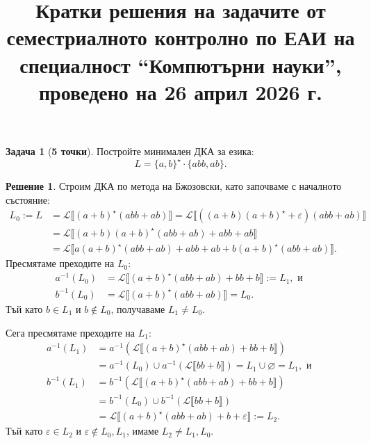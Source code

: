 \documentclass[12pt]{article}
\newcommand{\calL}{\mathcal{L}}
\newcommand{\db}[1]{\llbracket #1 \rrbracket}
\theoremstyle{definition}
\newtheorem{problem}{Задача}
\newtheorem*{solution}{Решение}
\begin{document}
\title{Кратки решения на задачите от семестриалното контролно по ЕАИ на специалност ``Компютърни науки'', проведено на 26 април 2026 г.}
\date{}

\maketitle

\begin{problem}[{\bf 5 точки}]
Постройте минимален ДКА за езика:
\[
  L = \{ a, b \}^\star \cdot \{ abb, ab \}.
\]
\end{problem}

\begin{solution}
Строим ДКА по метода на Бжозовски, като започваме с началното състояние:
\begin{align*}
  L_0 := L & = \calL \db{(a + b)^\star (abb + ab)} = \calL \db{((a + b)(a + b)^\star + \varepsilon) (abb + ab)} \\ 
           & = \calL \db{(a + b)(a + b)^\star (abb + ab) + abb + ab} \\
           & = \calL \db{a (a + b)^\star (abb + ab) + abb + ab + b (a + b)^\star (abb + ab)}.
\end{align*}
Пресмятаме преходите на $L_0$:
\begin{align*}
  a^{-1}(L_0) & = \calL \db{(a + b)^\star (abb + ab) + bb + b} := L_1, \text{ и } \\
  b^{-1}(L_0) & = \calL \db{(a + b)^\star (abb + ab)} = L_0.
\end{align*}
Тъй като $b \in L_1$ и $b \not\in L_0$, получаваме $L_1 \neq L_0$.

Сега пресмятаме преходите на $L_1$:
\begin{align*}
  a^{-1}(L_1) & = a^{-1}(\calL \db{(a + b)^\star (abb + ab) + bb + b}) \\ 
              & = a^{-1}(L_0) \cup a^{-1}(\calL \db{bb + b}) = L_1 \cup \varnothing = L_1, \text{ и } \\
  b^{-1}(L_1) & = b^{-1}(\calL \db{(a + b)^\star (abb + ab) + bb + b}) \\ 
              & = b^{-1}(L_0) \cup b^{-1}(\calL \db{bb + b}) \\ 
              & = \calL \db{(a + b)^\star (abb + ab) + b + \varepsilon} := L_2.
\end{align*}
Тъй като $\varepsilon \in L_2$ и $\varepsilon \not\in L_0, L_1$, имаме $L_2 \neq L_1, L_0$.


\end{solution}
\end{document}
